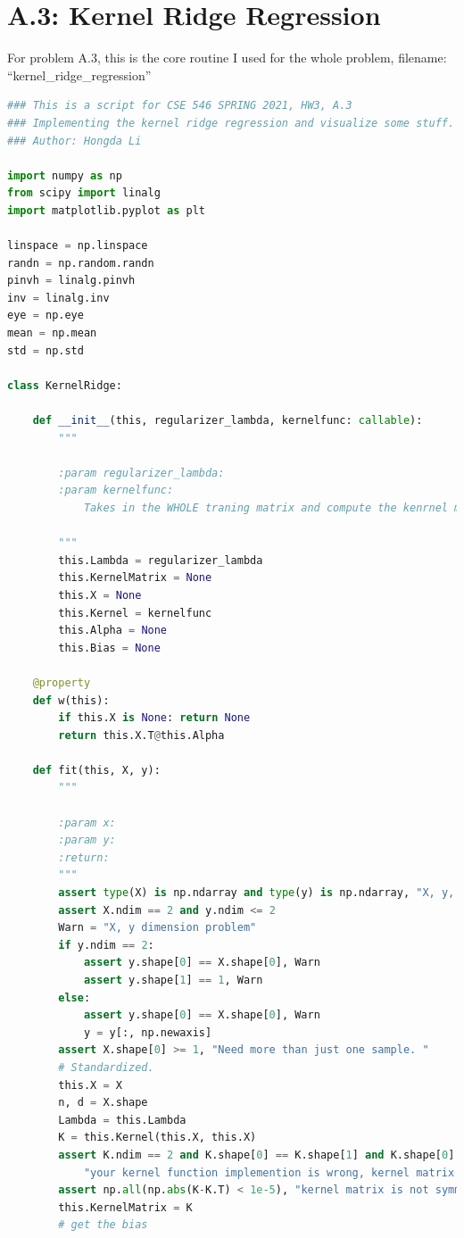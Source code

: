 \documentclass[]{article}
\begin{document}
\section*{A.3: Kernel Ridge Regression}
    For problem A.3, this is the core routine I used for the whole problem, filename: ``kernel\_ridge\_regression''
    \begin{lstlisting}[language=python]
### This is a script for CSE 546 SPRING 2021, HW3, A.3
### Implementing the kernel ridge regression and visualize some stuff.
### Author: Hongda Li

import numpy as np
from scipy import linalg
import matplotlib.pyplot as plt

linspace = np.linspace
randn = np.random.randn
pinvh = linalg.pinvh
inv = linalg.inv
eye = np.eye
mean = np.mean
std = np.std

class KernelRidge:

    def __init__(this, regularizer_lambda, kernelfunc: callable):
        """

        :param regularizer_lambda:
        :param kernelfunc:
            Takes in the WHOLE traning matrix and compute the kenrnel matrix K.

        """
        this.Lambda = regularizer_lambda
        this.KernelMatrix = None
        this.X = None
        this.Kernel = kernelfunc
        this.Alpha = None
        this.Bias = None

    @property
    def w(this):
        if this.X is None: return None
        return this.X.T@this.Alpha

    def fit(this, X, y):
        """

        :param x:
        :param y:
        :return:
        """
        assert type(X) is np.ndarray and type(y) is np.ndarray, "X, y, must be numpy array"
        assert X.ndim == 2 and y.ndim <= 2
        Warn = "X, y dimension problem"
        if y.ndim == 2:
            assert y.shape[0] == X.shape[0], Warn
            assert y.shape[1] == 1, Warn
        else:
            assert y.shape[0] == X.shape[0], Warn
            y = y[:, np.newaxis]
        assert X.shape[0] >= 1, "Need more than just one sample. "
        # Standardized.
        this.X = X
        n, d = X.shape
        Lambda = this.Lambda
        K = this.Kernel(this.X, this.X)
        assert K.ndim == 2 and K.shape[0] == K.shape[1] and K.shape[0] == n, \
            "your kernel function implemention is wrong, kernel matrix is having the wrong shape"
        assert np.all(np.abs(K-K.T) < 1e-5), "kernel matrix is not symmetric."
        this.KernelMatrix = K
        # get the bias


\end{lstlisting}
\end{document}
